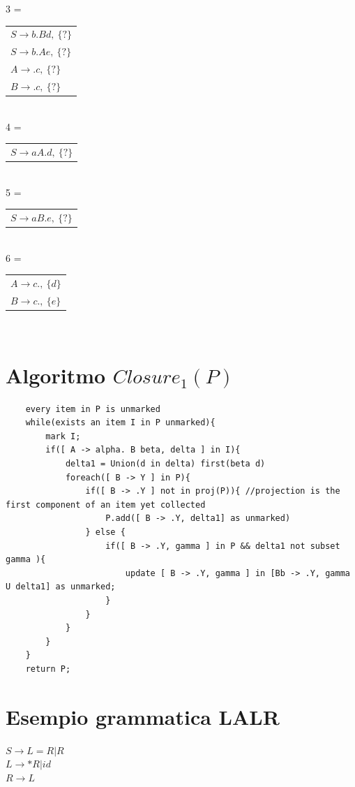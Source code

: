 3 =
\begin{tabular}{l}
	$S \rightarrow b.Bd,\ 	\{ ? \} $		\\
	$S \rightarrow b.Ae,\ 	\{ ? \} $		\\
	$A \rightarrow .c,\ 	\{ ?\} $		\\
	$B \rightarrow .c,\ 	\{ ?\} $		\\
\end{tabular}\\[5pt]


4 =
\begin{tabular}{l}
	$S \rightarrow aA.d,\ 	\{ ? \} $		\\
\end{tabular}\\[5pt]

5 =
\begin{tabular}{l}
	$S \rightarrow aB.e,\ 	\{ ? \} $		\\
\end{tabular}\\[5pt]

6 =
\begin{tabular}{l}
	$A \rightarrow c.,\ 	\{ d \} $		\\
	$B \rightarrow c.,\ 	\{ e \} $		\\
\end{tabular}\\[5pt]

\section{Algoritmo $Closure_1(P)$}
\begin{lstlisting}
	every item in P is unmarked
	while(exists an item I in P unmarked){
		mark I;
		if([ A -> alpha. B beta, delta ] in I){
			delta1 = Union(d in delta) first(beta d)
			foreach([ B -> Y ] in P){
				if([ B -> .Y ] not in proj(P)){ //projection is the first component of an item yet collected
					P.add([ B -> .Y, delta1] as unmarked)
				} else {
					if([ B -> .Y, gamma ] in P && delta1 not subset gamma ){
						update [ B -> .Y, gamma ] in [Bb -> .Y, gamma U delta1] as unmarked;
					}
				}
			}
		}
	}
	return P;
\end{lstlisting}

\section{Esempio grammatica LALR}

$S \rightarrow L = R | R$\\
$L \rightarrow *R|id$\\
$R \rightarrow L$\\

